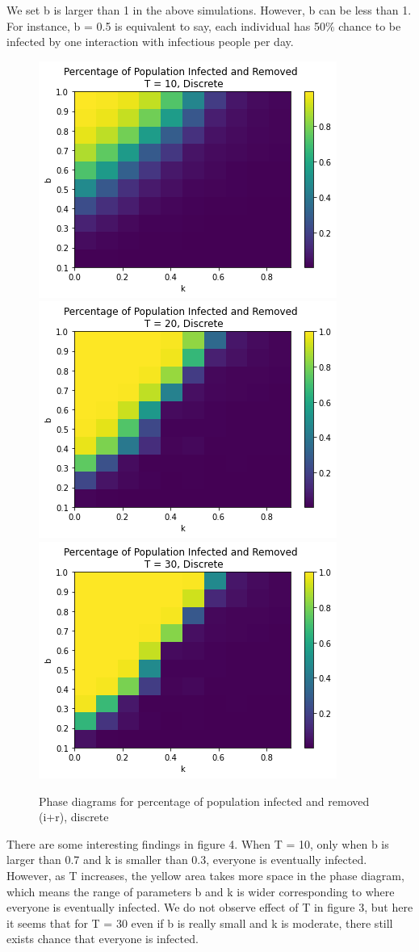 \documentclass{article}
\begin{document}
We set b is larger than 1 in the above simulations. However, b can be less than 1. For instance, b = 0.5 is equivalent to say, each individual has 50$\%$ chance to be infected by one interaction with infectious people per day.


\begin{figure}[htp]

\centering
\includegraphics[width=.3\textwidth]{Figure1_discrete_bsmall_T10.png}\hfill
\includegraphics[width=.3\textwidth]{Figure1_discrete_bsmall_T20.png}\hfill
\includegraphics[width=.3\textwidth]{Figure1_discrete_bsmall_T30.png}

\caption{Phase diagrams for percentage of population infected and removed (i+r), discrete}
\label{fig:figure3}

\end{figure}


There are some interesting findings in figure 4. When T = 10, only when b is larger than 0.7 and k is smaller than 0.3, everyone is eventually infected. However, as T increases, the yellow area takes more space in the phase diagram, which means the range of parameters b and k is wider corresponding to where everyone is eventually infected. We do not observe effect of T in figure 3, but here it seems that for T = 30 even if b is really small and k is moderate, there still exists chance that everyone is infected.
\end{document}

